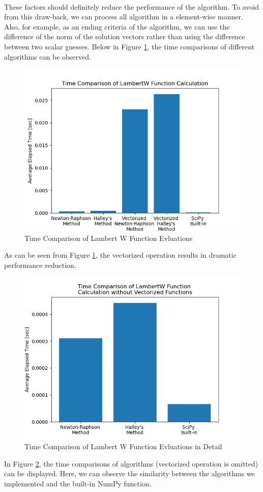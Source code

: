 \documentclass[letterpaper,12pt]{article}
\begin{document}
\paragraph{} These factors should definitely reduce the performance of the algorithm. To avoid from this draw-back, we can process all algorithm in a element-wise manner. Also, for example, as an ending criteria of the algorithm, we can use the difference of the norm of the solution vectors rather than using the difference between two scalar guesses. Below in Figure \ref{fig:lamberttime}, the time comparisons of different algorithms can be observed.
\begin{figure}[H] 
   \centering \includegraphics[width=0.5\columnwidth]{figures/lambertwtime.png}           
                  \caption{Time Comparison of Lambert W Function Evluations}                
                     \label{fig:lamberttime}
   \end{figure}
As can be seen from Figure \ref{fig:lamberttime}, the vectorized operation results in dramatic performance reduction.
\begin{figure}[H] 
   \centering \includegraphics[width=0.7\columnwidth]{figures/lambertwtimedetailed.png}           
                  \caption{Time Comparison of Lambert W Function Evluations in Detail}                
                     \label{fig:lamberttimedetailed}
   \end{figure}
   In Figure \ref{fig:lamberttimedetailed}, the time comparisons of algorithms (vectorized operation is omitted) can be displayed. Here, we can observe the similarity between the algorithms we implemented and the built-in NumPy function.
\end{document}
